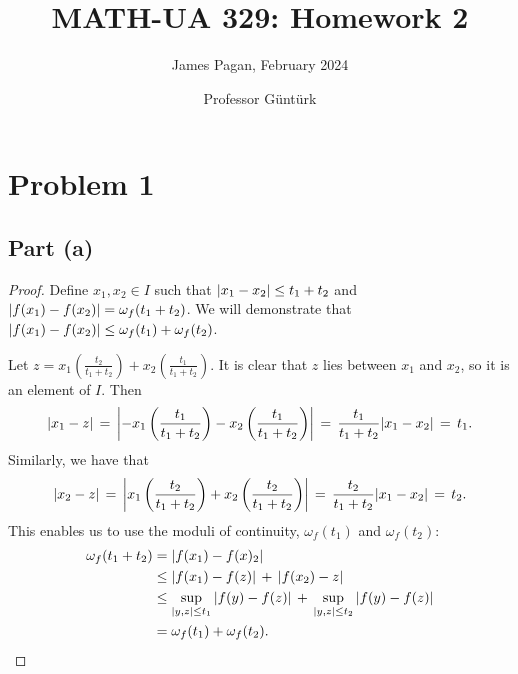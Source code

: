\documentclass[11pt]{article}
\title{MATH-UA 329: Homework 2}
\author{James Pagan, February 2024}
\date{Professor Güntürk}
\begin{document}
\maketitle
\tableofcontents
\newpage


\section{Problem 1}


\subsection{Part (a)}

\begin{proof}
  Define $x_{1}, x_{2} \in I$ such that $\abs{x_{1} - x_{2}} \le t_{1} + t_{2}$ and $\abs{f(x_{1}) - f(x_{2})} = \omega_{f}(t_{1} + t_{2})$. We will demonstrate that $\abs{f(x_{1}) - f(x_{2})} \le \omega_{f}(t_{1}) + \omega_{f}(t_{2})$.
  
  Let $z = x_{1} \left( \tfrac{t_{2}}{t_{1} + t_{2}} \right) + x_{2} \left( \tfrac{t_{1}}{t_{1} + t_{2}} \right)$. It is clear that $z$ lies between $x_{1}$ and $x_{2}$, so it is an element of $I$. Then
  \[
    \abs{x_{1} - z} \, = \, \abs{-x_{1} \left( \frac{t_{1}}{t_{1} + t_{2}} \right) - x_{2} \left( \frac{t_{1}}{t_{1} + t_{2}} \right)} \, = \, \frac{t_{1}}{t_{1} + t_{2}} \abs{x_{1} - x_{2}} \, = \, t_{1}.
  \]
  Similarly, we have that
  \[
    \abs{x_{2} - z} \, = \, \abs{x_{1} \left( \frac{t_{2}}{t_{1} + t_{2}} \right) + x_{2} \left( \frac{t_{2}}{t_{1} + t_{2}} \right)} \, = \, \frac{t_{2}}{t_{1} + t_{2}} \abs{x_{1} - x_{2}} \, = \, t_{2}.
  \]
  This enables us to use the moduli of continuity, $\omega_{f}(t_{1})$ and $\omega_{f}(t_{2})$:
  \begin{align*}
    \omega_{f}(t_{1} + t_{2}) & = \abs{f(x_{1}) - f(x)_{2}} \\
                              & \le \abs{f(x_{1}) - f(z)} \, + \, \abs{f(x_{2}) - z} \\
                              & \le \sup\limits_{\abs{y, z} \le t_{1}} \abs{f(y) - f(z)} \, + \, \sup\limits_{\abs{y, z} \le t_{2}} \abs{f(y) - f(z)} \\
                              & = \omega_{f}(t_{1}) + \omega_{f}(t_{2}).
  \end{align*}
\end{proof}
\end{document}
